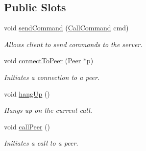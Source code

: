 \subsection*{\-Public \-Slots}
\begin{DoxyCompactItemize}
\item 
void \hyperlink{class_command_client_a3279b426a5718ed78a9c01fe11638617}{send\-Command} (\hyperlink{class_command_client_aa99b17193724fef8aed2b2c724b0c243}{\-Call\-Command} cmd)
\begin{DoxyCompactList}\small\item\em \-Allows client to send commands to the server. \end{DoxyCompactList}\item 
void \hyperlink{class_command_client_aab892b8c32beac570973990611bf3b04}{connect\-To\-Peer} (\hyperlink{class_peer}{\-Peer} $\ast$p)
\begin{DoxyCompactList}\small\item\em \-Initiates a connection to a peer. \end{DoxyCompactList}\item 
void \hyperlink{class_command_client_a5199922a9fc1be3cac4b70399451df60}{hang\-Up} ()
\begin{DoxyCompactList}\small\item\em \-Hangs up on the current call. \end{DoxyCompactList}\item 
void \hyperlink{class_command_client_a5e9d24302776437de353294cee9f3d19}{call\-Peer} ()
\begin{DoxyCompactList}\small\item\em \-Initiates a call to a peer. \end{DoxyCompactList}\end{DoxyCompactItemize}
